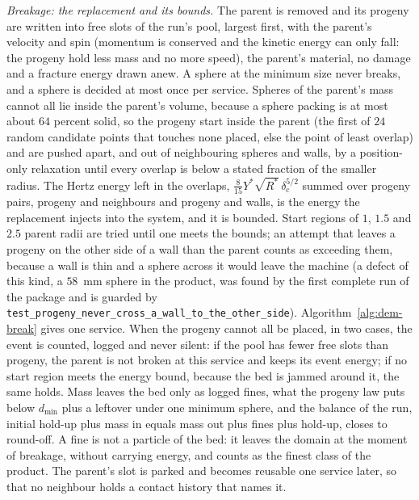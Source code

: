 \emph{Breakage: the replacement and its bounds.} The parent is removed and its progeny are written into free slots of the run's pool, largest first, with the parent's velocity and spin (momentum is conserved and the kinetic energy can only fall: the progeny hold less mass and no more speed), the parent's material, no damage and a fracture energy drawn
anew. A sphere at the minimum size never breaks, and a sphere is decided at most once per service. Spheres of the parent's mass cannot all lie inside the parent's volume, because a sphere packing is at most about $64$ percent solid, so the progeny start inside the parent (the first of $24$ random candidate points that touches none placed, else the point of least overlap) and are pushed apart, and out of neighbouring spheres and walls, by a
position-only relaxation until every overlap is below a stated fraction of the smaller radius. The Hertz energy left in the overlaps, $\tfrac{8}{15}Y^{\ast}\sqrt{R^{\ast}}\,\delta_{\mathrm c}^{5/2}$ summed over progeny pairs, progeny and neighbours and progeny and walls, is the energy the replacement injects into the system, and it is bounded. Start regions of $1$, $1.5$
and $2.5$ parent radii are tried until one meets the bounds; an attempt that leaves a progeny on the other side of a wall than the parent counts as exceeding them, because a wall is thin and a sphere across it would leave the machine (a defect of this kind, a $58$~mm sphere in the product, was found by the first complete run of the package and is guarded by \texttt{test\_progeny\_never\_cross\_a\_wall\_to\_the\_other\_side}). Algorithm~\ref{alg:dem-break} gives one service.
When the progeny cannot all be placed, in two cases, the event is counted, logged and never silent: if the pool has fewer free slots than progeny, the parent is not broken at this service and keeps its event energy; if no start region meets the energy bound, because the bed is jammed around it, the same holds. Mass leaves the bed only as logged fines, what the progeny law puts below $d_{\min}$ plus a leftover under one minimum sphere,
and the balance of the run, initial hold-up plus mass in equals mass out plus fines plus hold-up, closes to round-off. A fine is not a particle of the bed: it leaves the domain at the moment of breakage, without carrying energy, and counts as the finest class of the product. The parent's slot is parked and becomes reusable one service later, so that no neighbour holds a contact history that names it.

